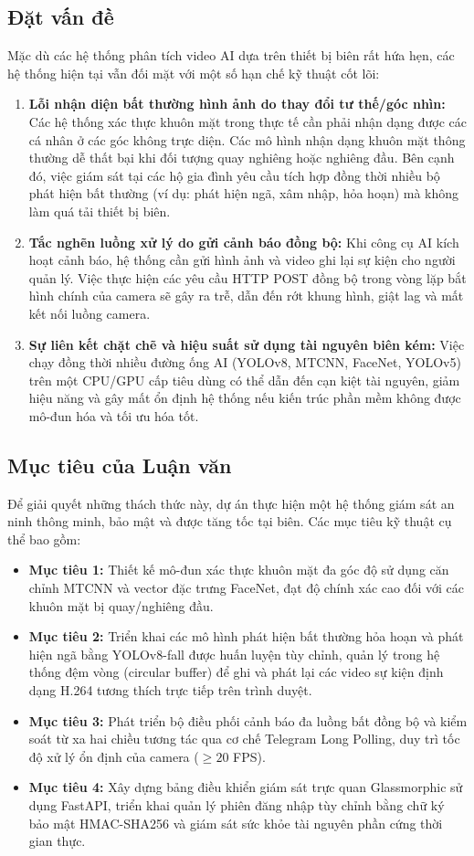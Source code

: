 \documentclass[12pt,a4paper]{article}
\begin{document}
\subsection{Đặt vấn đề}
Mặc dù các hệ thống phân tích video AI dựa trên thiết bị biên rất hứa hẹn, các hệ thống hiện tại vẫn đối mặt với một số hạn chế kỹ thuật cốt lõi:
\begin{enumerate}
    \item \textbf{Lỗi nhận diện bất thường hình ảnh do thay đổi tư thế/góc nhìn:} Các hệ thống xác thực khuôn mặt trong thực tế cần phải nhận dạng được các cá nhân ở các góc không trực diện. Các mô hình nhận dạng khuôn mặt thông thường dễ thất bại khi đối tượng quay nghiêng hoặc nghiêng đầu. Bên cạnh đó, việc giám sát tại các hộ gia đình yêu cầu tích hợp đồng thời nhiều bộ phát hiện bất thường (ví dụ: phát hiện ngã, xâm nhập, hỏa hoạn) mà không làm quá tải thiết bị biên.
    \item \textbf{Tắc nghẽn luồng xử lý do gửi cảnh báo đồng bộ:} Khi công cụ AI kích hoạt cảnh báo, hệ thống cần gửi hình ảnh và video ghi lại sự kiện cho người quản lý. Việc thực hiện các yêu cầu HTTP POST đồng bộ trong vòng lặp bắt hình chính của camera sẽ gây ra trễ, dẫn đến rớt khung hình, giật lag và mất kết nối luồng camera.
    \item \textbf{Sự liên kết chặt chẽ và hiệu suất sử dụng tài nguyên biên kém:} Việc chạy đồng thời nhiều đường ống AI (YOLOv8, MTCNN, FaceNet, YOLOv5) trên một CPU/GPU cấp tiêu dùng có thể dẫn đến cạn kiệt tài nguyên, giảm hiệu năng và gây mất ổn định hệ thống nếu kiến trúc phần mềm không được mô-đun hóa và tối ưu hóa tốt.
\end{enumerate}

\subsection{Mục tiêu của Luận văn}
Để giải quyết những thách thức này, dự án thực hiện một hệ thống giám sát an ninh thông minh, bảo mật và được tăng tốc tại biên. Các mục tiêu kỹ thuật cụ thể bao gồm:
\begin{itemize}
    \item \textbf{Mục tiêu 1:} Thiết kế mô-đun xác thực khuôn mặt đa góc độ sử dụng căn chỉnh MTCNN và vector đặc trưng FaceNet, đạt độ chính xác cao đối với các khuôn mặt bị quay/nghiêng đầu.
    \item \textbf{Mục tiêu 2:} Triển khai các mô hình phát hiện bất thường hỏa hoạn và phát hiện ngã bằng YOLOv8-fall được huấn luyện tùy chỉnh, quản lý trong hệ thống đệm vòng (circular buffer) để ghi và phát lại các video sự kiện định dạng H.264 tương thích trực tiếp trên trình duyệt.
    \item \textbf{Mục tiêu 3:} Phát triển bộ điều phối cảnh báo đa luồng bất đồng bộ và kiểm soát từ xa hai chiều tương tác qua cơ chế Telegram Long Polling, duy trì tốc độ xử lý ổn định của camera ($\ge 20$ FPS).
    \item \textbf{Mục tiêu 4:} Xây dựng bảng điều khiển giám sát trực quan Glassmorphic sử dụng FastAPI, triển khai quản lý phiên đăng nhập tùy chỉnh bằng chữ ký bảo mật HMAC-SHA256 và giám sát sức khỏe tài nguyên phần cứng thời gian thực.
\end{itemize}
\end{document}
